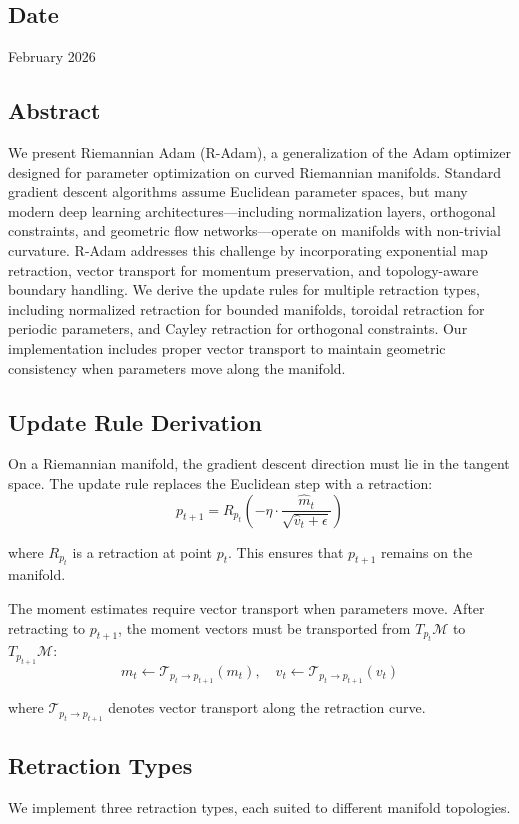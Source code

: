 \subsection*{Date}
February 2026
\subsection*{Abstract}
We present Riemannian Adam (R-Adam), a generalization of the Adam optimizer designed for parameter optimization on curved Riemannian manifolds. Standard gradient descent algorithms assume Euclidean parameter spaces, but many modern deep learning architectures—including normalization layers, orthogonal constraints, and geometric flow networks—operate on manifolds with non-trivial curvature. R-Adam addresses this challenge by incorporating exponential map retraction, vector transport for momentum preservation, and topology-aware boundary handling. We derive the update rules for multiple retraction types, including normalized retraction for bounded manifolds, toroidal retraction for periodic parameters, and Cayley retraction for orthogonal constraints. Our implementation includes proper vector transport to maintain geometric consistency when parameters move along the manifold.

\subsection{Update Rule Derivation}
On a Riemannian manifold, the gradient descent direction must lie in the tangent space. The update rule replaces the Euclidean step with a retraction:
$$p_{t+1} = R_{p_t}\left(-\eta \cdot \frac{\hat{m}_t}{\sqrt{\hat{v}_t + \epsilon}}\right)$$

where $R_{p_t}$ is a retraction at point $p_t$. This ensures that $p_{t+1}$ remains on the manifold.

The moment estimates require vector transport when parameters move. After retracting to $p_{t+1}$, the moment vectors must be transported from $T_{p_t}\mathcal{M}$ to $T_{p_{t+1}}\mathcal{M}$:
$$m_t \leftarrow \mathcal{T}_{p_t \to p_{t+1}}(m_t), \quad v_t \leftarrow \mathcal{T}_{p_t \to p_{t+1}}(v_t)$$

where $\mathcal{T}_{p_t \to p_{t+1}}$ denotes vector transport along the retraction curve.

\subsection{Retraction Types}
We implement three retraction types, each suited to different manifold topologies.

